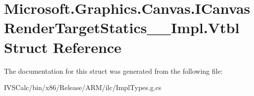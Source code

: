 \hypertarget{struct_microsoft_1_1_graphics_1_1_canvas_1_1_i_canvas_render_target_statics_____impl_1_1_vtbl}{}\section{Microsoft.\+Graphics.\+Canvas.\+I\+Canvas\+Render\+Target\+Statics\+\_\+\+\_\+\+Impl.\+Vtbl Struct Reference}
\label{struct_microsoft_1_1_graphics_1_1_canvas_1_1_i_canvas_render_target_statics_____impl_1_1_vtbl}


The documentation for this struct was generated from the following file\+:\begin{DoxyCompactItemize}
\item 
I\+V\+S\+Calc/bin/x86/\+Release/\+A\+R\+M/ilc/Impl\+Types.\+g.\+cs\end{DoxyCompactItemize}
